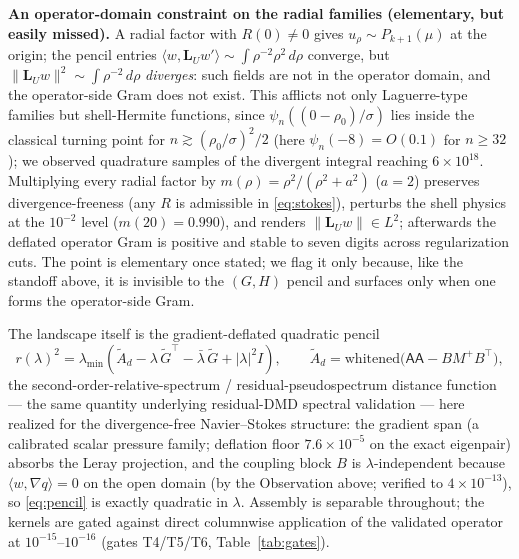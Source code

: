 \documentclass[11pt]{article}
\newcommand{\LU}{\mathbf{L}_{U}}
\theoremstyle{plain}
\theoremstyle{remark}
\begin{document}
\medskip\noindent\textbf{An operator-domain constraint on the radial
families (elementary, but easily missed).}\enspace
A radial factor with $R(0)\ne 0$ gives $u_\rho \sim P_{k+1}(\mu)$ at the
origin; the pencil entries
$\langle w, \LU w'\rangle \sim \int \rho^{-2}\rho^2\,d\rho$ converge,
but $\|\LU w\|^2 \sim \int \rho^{-2}\,d\rho$ \emph{diverges}: such
fields are not in the operator domain, and the operator-side Gram does
not exist. This afflicts not only Laguerre-type families but
shell-Hermite functions, since $\psi_n((0-\rho_0)/\sigma)$ lies inside
the classical turning point for $n \gtrsim (\rho_0/\sigma)^2/2$
(here $\psi_n(-8) = O(0.1)$ for $n \ge 32$); we observed quadrature
samples of the divergent integral reaching $6\times 10^{18}$.
Multiplying every radial factor by
$m(\rho) = \rho^2/(\rho^2 + a^2)$ ($a = 2$) preserves
divergence-freeness (any $R$ is admissible in \eqref{eq:stokes}),
perturbs the shell physics at the $10^{-2}$ level
($m(20) = 0.990$), and renders $\|\LU w\| \in L^2$; afterwards the
deflated operator Gram is positive and stable to seven digits across
regularization cuts. The point is elementary once stated; we flag it
only because, like the standoff above, it is invisible to the
$(G,H)$ pencil and surfaces only when one forms the operator-side
Gram.

The landscape itself is the gradient-deflated quadratic pencil
\begin{equation}\label{eq:pencil}
r(\lambda)^2 = \lambda_{\min}\!\left(
\tilde A_d - \lambda\,\tilde G^{\!\top} - \bar\lambda\,\tilde G
+ |\lambda|^2 I \right),\qquad
\tilde A_d = \text{whitened}\bigl(\mathsf{AA} - B M^{+} B^{\!\top}\bigr),
\end{equation}
the second-order-relative-spectrum / residual-pseudospectrum
distance function \cite{LS04,TE05,Colbrook23} --- the same quantity
underlying residual-DMD spectral validation --- here realized for the
divergence-free Navier--Stokes structure: the
gradient span (a calibrated scalar pressure family; deflation floor
$7.6\times 10^{-5}$ on the exact eigenpair) absorbs the Leray
projection, and the coupling block $B$ is $\lambda$-independent because
$\langle w, \nabla q\rangle = 0$ on the open domain
(by the Observation above; verified to $4\times 10^{-13}$), so
\eqref{eq:pencil} is exactly quadratic in $\lambda$. Assembly is
separable throughout; the kernels are gated against direct columnwise
application of the validated operator at $10^{-15}$--$10^{-16}$
(gates T4/T5/T6, Table~\ref{tab:gates}).
\end{document}
